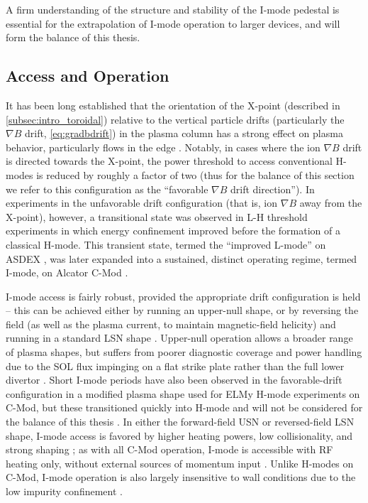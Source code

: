 \noindent A firm understanding of the structure and stability of the I-mode pedestal is essential for the extrapolation of I-mode operation to larger devices, and will form the balance of this thesis.

\subsection{Access and Operation}\label{subsec:hcr_imode_access}

It has been long established that the orientation of the X-point (described in \cref{subsec:intro_toroidal}) relative to the vertical particle drifts (particularly the $\nabla B$ drift, \cref{eq:gradbdrift}) in the plasma column has a strong effect on plasma behavior, particularly flows in the edge \cite{LaBombard2004,Fenzi2005,Hubbard2007,LaBombard2008}.  Notably, in cases where the ion $\nabla B$ drift is directed towards the X-point, the power threshold to access conventional H-modes is reduced by roughly a factor of two \cite{Carlstrom1998,Groebner1998,Suttrop2003} (thus for the balance of this section we refer to this configuration as the ``favorable $\nabla B$ drift direction'').  In experiments in the unfavorable drift configuration (that is, ion $\nabla B$ away from the X-point), however, a transitional state was observed in L-H threshold experiments in which energy confinement improved before the formation of a classical H-mode.  This transient state, termed the ``improved L-mode'' on ASDEX \cite{Ryter1998}, was later expanded into a sustained, distinct operating regime, termed I-mode, on Alcator C-Mod \cite{Whyte2010,McDermott2009a,Hubbard2011}.

I-mode access is fairly robust, provided the appropriate drift configuration is held -- this can be achieved either by running an upper-null shape, or by reversing the field (as well as the plasma current, to maintain magnetic-field helicity) and running in a standard LSN shape \cite{Hubbard2012}.  Upper-null operation allows a broader range of plasma shapes, but suffers from poorer diagnostic coverage and power handling due to the SOL flux impinging on a flat strike plate rather than the full lower divertor \cite{Hubbard2012,Dominguez2012}.  Short I-mode periods have also been observed in the favorable-drift configuration in a modified plasma shape used for ELMy H-mode experiments on C-Mod, but these transitioned quickly into H-mode and will not be considered for the balance of this thesis \cite{Dominguez2012,Hughes2013}.  In either the forward-field USN or reversed-field LSN shape, I-mode access is favored by higher heating powers, low collisionality, and strong shaping \cite{Whyte2010}; as with all C-Mod operation, I-mode is accessible with RF heating only, without external sources of momentum input \cite{Hubbard2012b}.  Unlike H-modes on C-Mod, I-mode operation is also largely insensitive to wall conditions due to the low impurity confinement \cite{Hubbard2012}.

